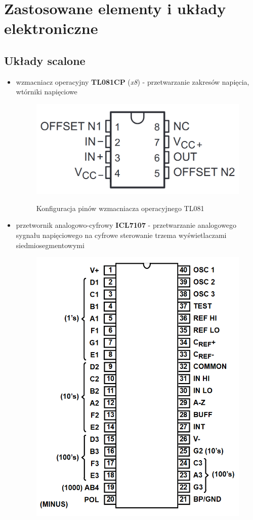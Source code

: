 \documentclass[12pt]{article}
\begin{document}
\section{Zastosowane elementy i układy elektroniczne}
\subsection{Układy scalone}
\begin{itemize}
	\item wzmacniacz operacyjny \textbf{TL081CP} (\textit{x8}) - przetwarzanie zakresów napięcia, wtórniki napięciowe
	\begin{figure}[h]
	\centering
	\includegraphics[scale=0.2]{tl081_pinout.png}
	\label{tl081_pinout}
	\caption{Konfiguracja pinów wzmacniacza operacyjnego TL081}
	\end{figure}
	\item przetwornik analogowo-cyfrowy \textbf{ICL7107} - przetwarzanie analogowego sygnału napięciowego na 		cyfrowe sterowanie trzema wyświetlaczami siedmiosegmentowymi
	\begin{figure}[h]
	\centering
	\includegraphics[scale=0.3]{icl7107_pinout.png}

\end{figure}
\end{itemize}
\end{document}
